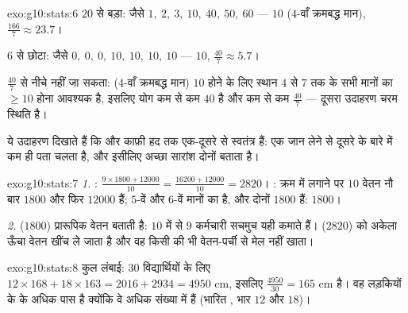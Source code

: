 \begin{solution}{exo:g10:stats:6}
 $20$ से बड़ा: जैसे $1,\ 2,\ 3,\ 10,\ 40,\ 50,\ 60$ ---  $10$ ($4$-वाँ क्रमबद्ध मान),
 $\frac{166}{7} \approx 23.7$।

 $6$ से छोटा: जैसे $0,\ 0,\ 0,\ 10,\ 10,\ 10,\ 10$ ---  $10$,  $\frac{40}{7} \approx 5.7$।

 $\frac{40}{7}$ से नीचे नहीं जा सकता:  ($4$-वाँ क्रमबद्ध मान) $10$ होने
के लिए स्थान $4$ से $7$ तक के सभी मानों का $\geq 10$ होना आवश्यक है, इसलिए योग
कम से कम $40$ है और  कम से कम $\frac{40}{7}$ --- दूसरा उदाहरण चरम स्थिति है।

ये उदाहरण दिखाते हैं कि  और  काफ़ी हद तक एक-दूसरे से स्वतंत्र
हैं: एक जान लेने से दूसरे के बारे में कम ही पता चलता है, और इसीलिए अच्छा
सारांश दोनों बताता है।
\end{solution}

\begin{solution}{exo:g10:stats:7}
\emph{1.} : $\frac{9 \times 1800 + 12000}{10} = \frac{16200 + 12000}{10} = 2820$। : क्रम में लगाने पर $10$ वेतन नौ बार $1800$
और फिर $12000$ हैं;  $5$-वें और $6$-वें मानों का  है, और
दोनों $1800$ हैं:  $1800$।

\emph{2.}  ($1800$) प्रारूपिक वेतन बताती है: $10$ में से $9$
कर्मचारी सचमुच यही कमाते हैं।  ($2820$) को अकेला ऊँचा वेतन खींच ले जाता
है और वह किसी की भी वेतन-पर्ची से मेल नहीं खाता।
\end{solution}

\begin{solution}{exo:g10:stats:8}
कुल लंबाई: $30$ विद्यार्थियों के लिए $12 \times 168 + 18 \times 163 = 2016 + 2934 = 4950$ cm, इसलिए  $\frac{4950}{30} = 165$ cm है। वह
लड़कियों के  के अधिक पास है क्योंकि वे अधिक संख्या में हैं (भारित
, भार $12$ और $18$)।
\end{solution}

